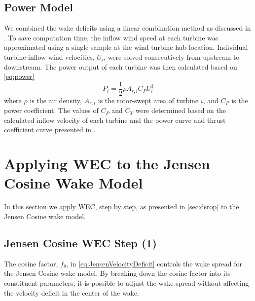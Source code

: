 \documentclass[a4paper]{jpconf}
\begin{document}
\subsection{Power Model}
We combined the wake deficits using a linear combination method as discussed in \cite{niayifar2016}. To save computation time, the inflow wind speed at each turbine was approximated using a single sample at the wind turbine hub location. Individual turbine inflow wind velocities, $U_i$, were solved consecutively from upstream to downstream. The power output of each turbine was then calculated based on \cref{eq:power}
%
\begin{equation}\label{eq:power}
P_i = \frac{1}{2}\rho A_{r,i}C_P U_i^3
\end{equation}
%
where $\rho$ is the air density, $A_{r,i}$ is the rotor-swept area of turbine $i$, and $C_P$ is the power coefficient. The values of $C_P$ and $C_T$ were determined based on the calculated inflow velocity of each turbine and the power curve and thrust coefficient curve presented in \cite{niayifar2016}.

\section{Applying WEC to the Jensen Cosine Wake Model}
In this section we apply WEC, step by step, as presented in \cref{sec:dsrop} to the Jensen Cosine wake model.  


\subsection{Jensen Cosine WEC Step (1)}

The cosine factor, $f_\theta$, in \cref{eq:JensenVelocityDeficit} controls the wake spread for the Jensen Cosine wake model. By breaking down the cosine factor into its constituent parameters, it is possible to adjust the wake spread without affecting the velocity deficit in the center of the wake.
\end{document}
